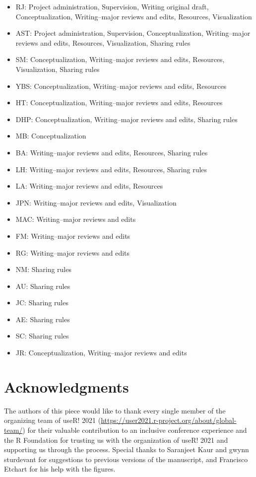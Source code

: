 \documentclass[10pt,letterpaper]{article}
\begin{document}
\begin{itemize}
    \item RJ: Project administration, Supervision, Writing original draft, Conceptualization, Writing--major reviews and edits, Resources, Visualization
    \item AST: Project administration, Supervision, Conceptualization,  Writing--major reviews and edits, Resources, Visualization, Sharing rules
    \item SM: Conceptualization, Writing--major reviews and edits, Resources, Visualization, Sharing rules
    \item YBS: Conceptualization, Writing--major reviews and edits, Resources
    \item HT: Conceptualization, Writing--major reviews and edits, Resources
    \item DHP: Conceptualization, Writing--major reviews and edits, Sharing rules
    \item MB: Conceptualization
    \item BA: Writing--major reviews and edits, Resources, Sharing rules
    \item LH: Writing--major reviews and edits, Resources, Sharing rules
    \item LA: Writing--major reviews and edits, Resources
    \item JPN: Writing--major reviews and edits, Visualization
    \item MAC: Writing--major reviews and edits
    \item FM: Writing--major reviews and edits
    \item RG: Writing--major reviews and edits
    \item NM: Sharing rules
    \item AU: Sharing rules
    \item JC: Sharing rules
    \item AE: Sharing rules
    \item SC: Sharing rules
    \item JR: Conceptualization, Writing--major reviews and edits
\end{itemize}



\section*{Acknowledgments}
The authors of this piece would like to thank every single member of the organizing team of useR! 2021 (\url{https://user2021.r-project.org/about/global-team/}) for their valuable contribution to an inclusive conference experience and the R Foundation for trusting us with the organization of useR! 2021 and supporting us through the process. Special thanks to Saranjeet Kaur and gwynn sturdevant for suggestions to previous versions of the manuscript, and Francisco Etchart for his help with the figures.
\end{document}
